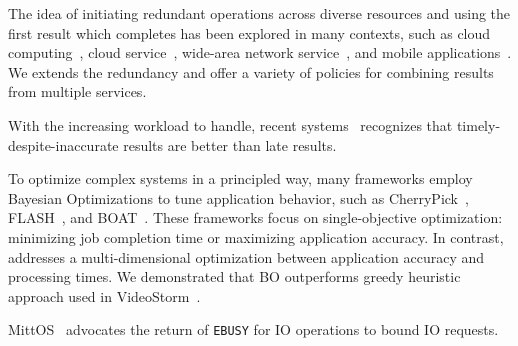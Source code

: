  The idea of initiating redundant operations
across diverse resources and using the first result which completes has been
explored in many contexts, such as cloud
computing~\cite{ananthanarayanan2013effective}, cloud
service~\cite{dean2013tail}, wide-area network service~\cite{vulimiri2013low},
and mobile applications~\cite{gordon2015accelerating}. We extends the redundancy
and offer a variety of policies for combining results from multiple services.

 With the increasing workload to handle, recent
systems~\cite{agarwal2013blinkdb, rabkin2014aggregation, zhang2017live}
recognizes that timely-despite-inaccurate results are better than late
results.

 To optimize complex systems in a principled way,
many frameworks employ Bayesian Optimizations to tune application behavior, such
as CherryPick~\cite{alipourfard2017cherrypick}, FLASH~\cite{zhang2016flash}, and
BOAT~\cite{dalibard2017boat}. These frameworks focus on single-objective
optimization: minimizing job completion time or maximizing application
accuracy. In contrast, \sysname{} addresses a multi-dimensional optimization
between application accuracy and processing times. We demonstrated that BO
outperforms greedy heuristic approach used in VideoStorm~\cite{zhang2017live}.

 MittOS~\cite{hao2017mittos} advocates the return of
\texttt{EBUSY} for IO operations to bound IO requests.


